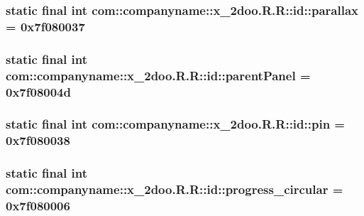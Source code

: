 \hypertarget{classcom_1_1companyname_1_1x__2doo_1_1_r_1_1id_fda1a00316dcb1009f127f1d4a4d9099}{
\subsubsection[{parallax}]{\setlength{\rightskip}{0pt plus 5cm}static final int com::companyname::x\_\-2doo.R.R::id::parallax = 0x7f080037}}
\label{classcom_1_1companyname_1_1x__2doo_1_1_r_1_1id_fda1a00316dcb1009f127f1d4a4d9099}


\hypertarget{classcom_1_1companyname_1_1x__2doo_1_1_r_1_1id_4f1f4d4b688c8df1f5711bea527ce14e}{
\subsubsection[{parentPanel}]{\setlength{\rightskip}{0pt plus 5cm}static final int com::companyname::x\_\-2doo.R.R::id::parentPanel = 0x7f08004d}}
\label{classcom_1_1companyname_1_1x__2doo_1_1_r_1_1id_4f1f4d4b688c8df1f5711bea527ce14e}


\hypertarget{classcom_1_1companyname_1_1x__2doo_1_1_r_1_1id_31c3fa0ec2b98843dbe7f64663c6ea61}{
\subsubsection[{pin}]{\setlength{\rightskip}{0pt plus 5cm}static final int com::companyname::x\_\-2doo.R.R::id::pin = 0x7f080038}}
\label{classcom_1_1companyname_1_1x__2doo_1_1_r_1_1id_31c3fa0ec2b98843dbe7f64663c6ea61}


\hypertarget{classcom_1_1companyname_1_1x__2doo_1_1_r_1_1id_f9e16e446140b6c63b7da5f1bd15b051}{
\subsubsection[{progress\_\-circular}]{\setlength{\rightskip}{0pt plus 5cm}static final int com::companyname::x\_\-2doo.R.R::id::progress\_\-circular = 0x7f080006}}
\label{classcom_1_1companyname_1_1x__2doo_1_1_r_1_1id_f9e16e446140b6c63b7da5f1bd15b051}


